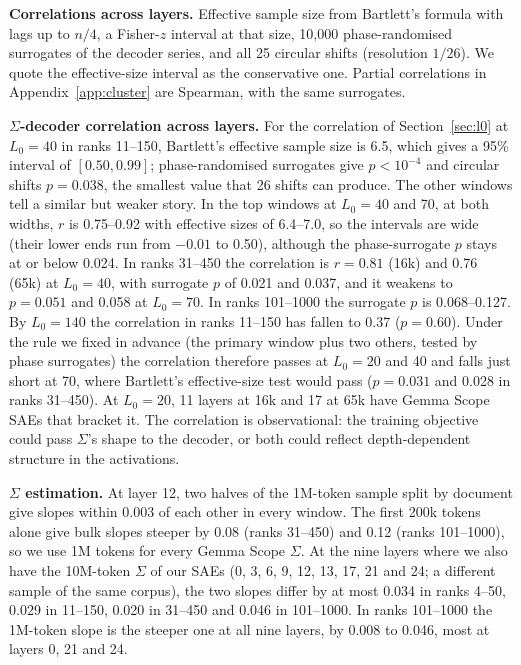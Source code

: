 \documentclass[10pt,twocolumn]{article}
\newcommand{\Sig}{\Sigma}
\newcommand{\Lz}{L_0}
\begin{document}
\textbf{Correlations across layers.} Effective sample size from Bartlett's formula with lags up to $n/4$, a Fisher-$z$ interval at that size, 10,000 phase-randomised surrogates of the decoder series, and all 25 circular shifts (resolution $1/26$). We quote the effective-size interval as the conservative one. Partial correlations in Appendix~\ref{app:cluster} are Spearman, with the same surrogates.

\textbf{$\Sig$-decoder correlation across layers.}
\label{app:corr}
For the correlation of Section~\ref{sec:l0} at $\Lz=40$ in ranks 11--150, Bartlett's effective sample size is 6.5, which gives a 95\% interval of $[0.50, 0.99]$; phase-randomised surrogates give $p<10^{-4}$ and circular shifts $p=0.038$, the smallest value that 26 shifts can produce. The other windows tell a similar but weaker story. In the top windows at $\Lz=40$ and 70, at both widths, $r$ is 0.75--0.92 with effective sizes of 6.4--7.0, so the intervals are wide (their lower ends run from $-0.01$ to 0.50), although the phase-surrogate $p$ stays at or below 0.024. In ranks 31--450 the correlation is $r=0.81$ (16k) and 0.76 (65k) at $\Lz=40$, with surrogate $p$ of 0.021 and 0.037, and it weakens to $p=0.051$ and 0.058 at $\Lz=70$. In ranks 101--1000 the surrogate $p$ is 0.068--0.127. By $\Lz=140$ the correlation in ranks 11--150 has fallen to 0.37 ($p=0.60$). Under the rule we fixed in advance (the primary window plus two others, tested by phase surrogates) the correlation therefore passes at $\Lz=20$ and 40 and falls just short at 70, where Bartlett's effective-size test would pass ($p=0.031$ and 0.028 in ranks 31--450). At $\Lz=20$, 11 layers at 16k and 17 at 65k have Gemma Scope SAEs that bracket it. The correlation is observational: the training objective could pass $\Sig$'s shape to the decoder, or both could reflect depth-dependent structure in the activations.

\textbf{$\Sig$ estimation.} At layer 12, two halves of the 1M-token sample split by document give slopes within 0.003 of each other in every window. The first 200k tokens alone give bulk slopes steeper by 0.08 (ranks 31--450) and 0.12 (ranks 101--1000), so we use 1M tokens for every Gemma Scope $\Sig$. At the nine layers where we also have the 10M-token $\Sig$ of our SAEs (0, 3, 6, 9, 12, 13, 17, 21 and 24; a different sample of the same corpus), the two slopes differ by at most 0.034 in ranks 4--50, 0.029 in 11--150, 0.020 in 31--450 and 0.046 in 101--1000. In ranks 101--1000 the 1M-token slope is the steeper one at all nine layers, by 0.008 to 0.046, most at layers 0, 21 and 24.
\end{document}
